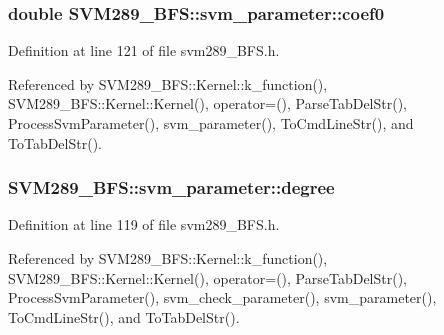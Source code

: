 \subsubsection[{\texorpdfstring{coef0}{coef0}}]{\setlength{\rightskip}{0pt plus 5cm}double S\+V\+M289\+\_\+\+B\+F\+S\+::svm\+\_\+parameter\+::coef0}\hypertarget{struct_s_v_m289___b_f_s_1_1svm__parameter_af0131a9fb06c4e9a071e51685632ad91}{}\label{struct_s_v_m289___b_f_s_1_1svm__parameter_af0131a9fb06c4e9a071e51685632ad91}


Definition at line 121 of file svm289\+\_\+\+B\+F\+S.\+h.



Referenced by S\+V\+M289\+\_\+\+B\+F\+S\+::\+Kernel\+::k\+\_\+function(), S\+V\+M289\+\_\+\+B\+F\+S\+::\+Kernel\+::\+Kernel(), operator=(), Parse\+Tab\+Del\+Str(), Process\+Svm\+Parameter(), svm\+\_\+parameter(), To\+Cmd\+Line\+Str(), and To\+Tab\+Del\+Str().

\subsubsection[{\texorpdfstring{degree}{degree}}]{ S\+V\+M289\+\_\+\+B\+F\+S\+::svm\+\_\+parameter\+::degree}\hypertarget{struct_s_v_m289___b_f_s_1_1svm__parameter_af2526e310e1a21859ad4aaa9de7bd6ce}{}\label{struct_s_v_m289___b_f_s_1_1svm__parameter_af2526e310e1a21859ad4aaa9de7bd6ce}


Definition at line 119 of file svm289\+\_\+\+B\+F\+S.\+h.



Referenced by S\+V\+M289\+\_\+\+B\+F\+S\+::\+Kernel\+::k\+\_\+function(), S\+V\+M289\+\_\+\+B\+F\+S\+::\+Kernel\+::\+Kernel(), operator=(), Parse\+Tab\+Del\+Str(), Process\+Svm\+Parameter(), svm\+\_\+check\+\_\+parameter(), svm\+\_\+parameter(), To\+Cmd\+Line\+Str(), and To\+Tab\+Del\+Str().

